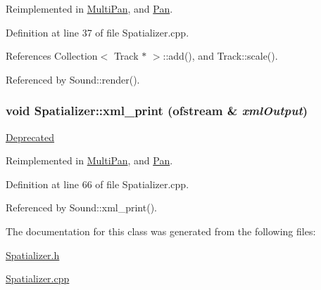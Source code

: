 Reimplemented in \hyperlink{classMultiPan_a6}{Multi\-Pan}, and \hyperlink{classPan_a3}{Pan}.

Definition at line 37 of file Spatializer.cpp.

References Collection$<$ Track $\ast$ $>$::add(), and Track::scale().

Referenced by Sound::render().\hypertarget{classSpatializer_a2}{
\subsubsection[xml\_\-print]{\setlength{\rightskip}{0pt plus 5cm}void Spatializer::xml\_\-print (ofstream \& {\em xml\-Output})}}
\label{classSpatializer_a2}


\begin{Desc}
\item[\hyperlink{deprecated__deprecated000035}{Deprecated}]\end{Desc}


Reimplemented in \hyperlink{classMultiPan_a7}{Multi\-Pan}, and \hyperlink{classPan_a4}{Pan}.

Definition at line 66 of file Spatializer.cpp.

Referenced by Sound::xml\_\-print().

The documentation for this class was generated from the following files:\begin{CompactItemize}
\item 
\hyperlink{Spatializer_8h}{Spatializer.h}\item 
\hyperlink{Spatializer_8cpp}{Spatializer.cpp}\end{CompactItemize}

